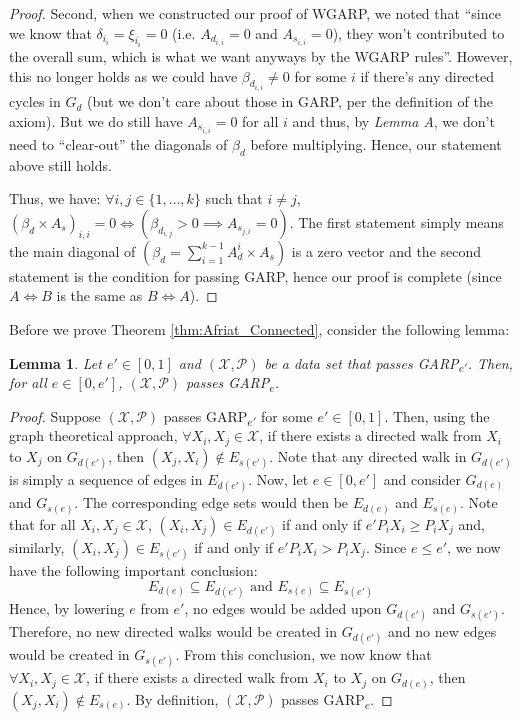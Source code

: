\documentclass{article} %
\theoremstyle{style1}
\newtheorem{lemma}[theorem]{Lemma}
\theoremstyle{example}
\begin{document}
\begin{proof}
Second, when we constructed our proof of WGARP, we noted that ``since we know that $\delta_{i_i}=\xi_{i_i}=0$ (i.e. $A_{d_{i,i}}=0$ and $A_{s_{i,i}}=0$), they won't contributed to the overall sum, which is what we want anyways by the WGARP rules''. However, this no longer holds as we could have $\beta_{d_{i,i}}\not=0$ for some $i$ if there's any directed cycles in $G_d$ (but we don't care about those in GARP, per the definition of the axiom). But we do still have $A_{s_{i,i}}=0$ for all $i$ and thus, by \textit{Lemma A}, we don't need to ``clear-out'' the diagonals of $\beta_d$ before multiplying. Hence, our statement above still holds. 

Thus, we have: $\forall i, j\in\{1,\ldots,k\}$ such that $i\not=j$, $(\beta_d\times A_s)_{i,i}=0 \iff (\beta_{d_{i,j}}>0 \implies A_{s_{j,i}}=0)$. The first statement simply means the main diagonal of $(\beta_d=\sum_{i=1}^{k-1}A_{d}^{i}\times A_s)$ is a zero vector and the second statement is the condition for passing GARP, hence our proof is complete (since $A\iff B$ is the same as $B\iff A$).
\end{proof}

\AfriatConnected*
Before we prove Theorem \ref{thm:Afriat_Connected}, consider the following lemma:

\begin{lemma}\label{Lemma:Connectedness}
Let $e'\in[0,1]$ and $(\mathcal{X},\mathcal{P})$ be a data set that passes GARP\textsubscript{$e'$}. Then, for all $e\in[0,e']$, $(\mathcal{X},\mathcal{P})$ passes GARP\textsubscript{$e$}.
\end{lemma}
\begin{proof}
Suppose $(\mathcal{X},\mathcal{P})$ passes GARP\textsubscript{$e'$} for some $e'\in[0,1]$. Then, using the graph theoretical approach, $\forall X_i,X_j\in\mathcal{X}$, if there exists a directed walk from $X_i$ to $X_j$ on $G_{d(e')}$, then $(X_j,X_i)\not\in E_{s(e')}$. Note that any directed walk in $G_{d(e')}$ is simply a sequence of edges in $E_{d(e')}$. Now, let $e\in[0,e']$ and consider $G_{d(e)}$ and $G_{s(e)}$. The corresponding edge sets would then be $E_{d(e)}$ and $E_{s(e)}$. Note that for all $X_i,X_j\in\mathcal{X}$, $(X_i,X_j)\in  E_{d(e')}$ if and only if $e'P_iX_i\geq P_iX_j$ and, similarly,  $(X_i,X_j)\in  E_{s(e')}$ if and only if $e'P_iX_i>P_iX_j$. Since $e\leq e'$, we now have the following important conclusion: $$E_{d(e)}\subseteq E_{d(e')}\textrm{ and }E_{s(e)}\subseteq E_{s(e')}$$ Hence, by lowering $e$ from $e'$, no edges would be added upon $G_{d(e')}$ and $G_{s(e')}$. Therefore, no new directed walks would be created in $G_{d(e')}$ and no new edges would be created in $G_{s(e')}$. From this conclusion, we now know that $\forall X_i,X_j\in\mathcal{X}$, if there exists a directed walk from $X_i$ to $X_j$ on $G_{d(e)}$, then $(X_j,X_i)\not\in E_{s(e)}$. By definition, $(\mathcal{X},\mathcal{P})$ passes GARP\textsubscript{$e$}.
\end{proof}
\end{document}
